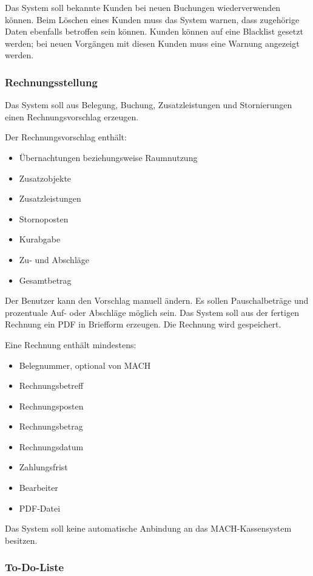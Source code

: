 Das System soll bekannte Kunden bei neuen Buchungen wiederverwenden können. Beim Löschen eines Kunden muss das System warnen, dass zugehörige Daten ebenfalls betroffen sein können. Kunden können auf eine Blacklist gesetzt werden; bei neuen Vorgängen mit diesen Kunden muss eine Warnung angezeigt werden.

\subsubsection{Rechnungsstellung}

Das System soll aus Belegung, Buchung, Zusatzleistungen und Stornierungen einen Rechnungsvorschlag erzeugen.

Der Rechnungsvorschlag enthält:

\begin{itemize}
\item Übernachtungen beziehungsweise Raumnutzung
\item Zusatzobjekte
\item Zusatzleistungen
\item Stornoposten
\item Kurabgabe
\item Zu- und Abschläge
\item Gesamtbetrag
\end{itemize}

Der Benutzer kann den Vorschlag manuell ändern. Es sollen Pauschalbeträge und prozentuale Auf- oder Abschläge möglich sein. Das System soll aus der fertigen Rechnung ein PDF in Briefform erzeugen. Die Rechnung wird gespeichert.

Eine Rechnung enthält mindestens:

\begin{itemize}
\item Belegnummer, optional von MACH
\item Rechnungsbetreff
\item Rechnungsposten
\item Rechnungsbetrag
\item Rechnungsdatum
\item Zahlungsfrist
\item Bearbeiter
\item PDF-Datei
\end{itemize}

Das System soll keine automatische Anbindung an das MACH-Kassensystem besitzen.

\subsubsection{To-Do-Liste}

